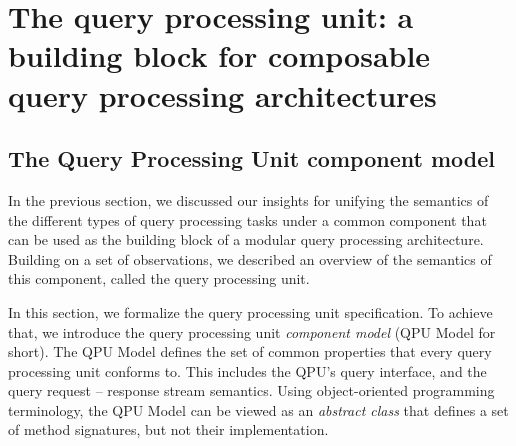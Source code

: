




\section{The query processing unit: a building block for composable query processing architectures}

\subsection{The Query Processing Unit component model}
\label{sec:QPU_model}
In the previous section, we discussed our insights for unifying the semantics of the different types
of query processing tasks under a common component
that can be used as the building block of a modular query processing architecture.
Building on a set of observations,
we described an overview of the semantics of this component, called the query processing unit.

In this section, we formalize the query processing unit specification.
To achieve that, we introduce the query processing unit \textit{component model} (QPU Model for short).
The QPU Model defines the set of common properties that every query processing unit conforms to.
This includes the QPU's query interface, and the query request -- response stream semantics.
Using object-oriented programming terminology, the QPU Model can be viewed as an \textit{abstract class}
that defines a set of method signatures, but not their implementation.

